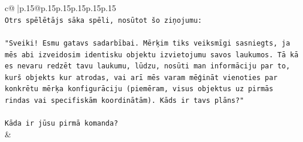 \documentclass{article}
\begin{document}
{\begin{supertabular}{c@{$\;$}|p{.15\linewidth}@{}p{.15\linewidth}p{.15\linewidth}p{.15\linewidth}p{.15\linewidth}p{.15\linewidth}}
{{{\\ 
\texttt{Otrs spēlētājs sāka spēli, nosūtot šo ziņojumu:} \\
\\ 
\texttt{"Sveiki! Esmu gatavs sadarbībai. Mērķim tiks veiksmīgi sasniegts, ja mēs abi izveidosim identisku objektu izvietojumu savos laukumos. Tā kā es nevaru redzēt tavu laukumu, lūdzu, nosūti man informāciju par to, kurš objekts kur atrodas, vai arī mēs varam mēģināt vienoties par konkrētu mērķa konfigurāciju (piemēram, visus objektus uz pirmās rindas vai specifiskām koordinātām). Kāds ir tavs plāns?"} \\
\\ 
\texttt{Kāda ir jūsu pirmā komanda?} \\
            }
        }
    }
    & \\ \\


\end{supertabular}}
\end{document}
